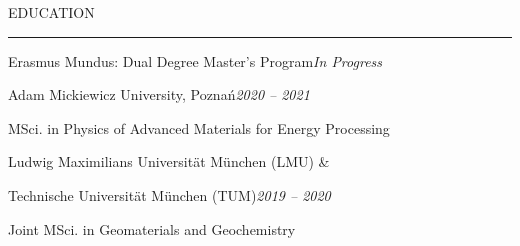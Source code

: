 \documentclass{resume} %
\renewenvironment{rSection}[1]{
	\sectionskip
	\textcolor{RoyalPurple}{\MakeUppercase{#1}}
	\sectionlineskip
	\hrule
	\begin{list}{}{
			\setlength{\leftmargin}{1.5em}
		}
		\item[]
	}{
	\end{list}
}
\begin{document}


\vspace{-2em}
	\begin{rSection}{Education} 
		
		\begin{rSubsection}{Erasmus Mundus: Dual Degree Master's Program}{\em In Progress}{}{}
				\begin{rSubsection}{\hspace{.04\textwidth} Adam Mickiewicz University, Pozna\'n}{\em 2020 -- 2021}{}{}
					\vspace{-.4em}
					\item[] \hspace{.04\textwidth} MSci. in Physics of Advanced Materials for Energy Processing
				\end{rSubsection}
				\vspace{-.3em}
				\begin{rSubsection}{\hspace{.04\textwidth} Ludwig Maximilians Universit{\"a}t  M{\"u}nchen (LMU) \&}{}{}{}
					\item[] \vspace{-2.75em}
				\end{rSubsection}
				\begin{rSubsection}{\hspace{.04\textwidth} Technische Universit{\"a}t M{\"u}nchen (TUM)}{\em 2019 -- 2020}{}{}
					\vspace{-.4em}
					\item[] \hspace{.04\textwidth} Joint MSci. in Geomaterials and Geochemistry
				\end{rSubsection}
		\end{rSubsection}
		

\end{rSection}
\end{document}
